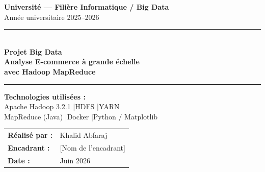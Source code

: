\documentclass[12pt,a4paper]{article}
\begin{document}
\begin{titlepage}
  \centering
  \vspace*{1.5cm}

  {\LARGE \textbf{Université — Filière Informatique / Big Data}}\\[0.4cm]
  {\large Année universitaire 2025--2026}

  \vspace{1.5cm}
  \rule{\linewidth}{1.5pt}\\[0.3cm]
  {\Huge \textbf{Projet Big Data}}\\[0.4cm]
  {\LARGE \textcolor{hadoopBlue}{\textbf{Analyse E-commerce à grande échelle\\
  avec Hadoop MapReduce}}}\\[0.3cm]
  \rule{\linewidth}{1.5pt}

  \vspace{1.5cm}

  \begin{tcolorbox}[colback=hadoopBlue!8, colframe=hadoopBlue, sharp corners,
                    width=0.85\textwidth]
    \centering
    \textbf{Technologies utilisées :}\\[0.3em]
    Apache Hadoop 3.2.1 \quad|\quad HDFS \quad|\quad YARN\\
    MapReduce (Java) \quad|\quad Docker \quad|\quad Python / Matplotlib
  \end{tcolorbox}

  \vspace{2cm}

  \begin{tabular}{ll}
    \textbf{Réalisé par :}  & Khalid Abfaraj \\[0.3em]
    \textbf{Encadrant :}    & [Nom de l'encadrant] \\[0.3em]
    \textbf{Date :}         & Juin 2026 \\
  \end{tabular}

  \vfill
\end{titlepage}

\tableofcontents
\newpage

\end{document}
